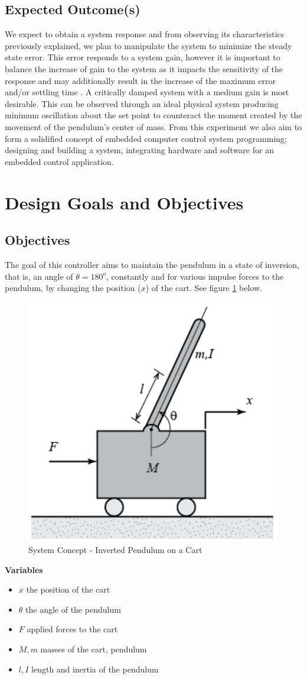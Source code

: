 \documentclass[12pt]{article}
\begin{document}
\subsection{Expected Outcome(s)}
We expect to obtain a system response and from observing its characteristics previously explained, we plan to manipulate the system to minimize the steady state error. This error  responds to a system gain, however it is important to balance the increase of gain to the system as it impacts the sensitivity of the response and may additionally result in the increase of the maximum error and/or settling time \cite{OCLoop}. A critically damped system with a medium gain is most desirable. This can be observed through an ideal physical system producing minimum oscillation about the set point to counteract the moment created by the movement of the pendulum's center of mass. From this experiment we also aim to form a solidified concept of embedded computer control system programming; designing and building a system, integrating hardware and software for an embedded control application.

\section{Design Goals and Objectives}
\subsection{Objectives}
The goal of this controller aims to maintain the pendulum in a state of inversion, that is, an angle of $\theta = 180^o$, constantly and for various impulse forces to the pendulum, by changing the position ($x$) of the cart. See figure \ref{fig:pend} below.
\begin{figure}[H]
    \centering
    \includegraphics[width=.4\linewidth]{figures/pend.png}
    \caption{System Concept - Inverted Pendulum on a Cart \cite{inv}}
    \label{fig:pend}
\end{figure}

\textbf{Variables}
\begin{itemize}
    \item $x$ the position of the cart
    \item $\theta$ the angle of the pendulum
    \item $F$ applied forces to the cart
    \item $M, m$ masses of the cart, pendulum
    \item $l, I$ length and inertia of the pendulum
\end{itemize}
\end{document}
